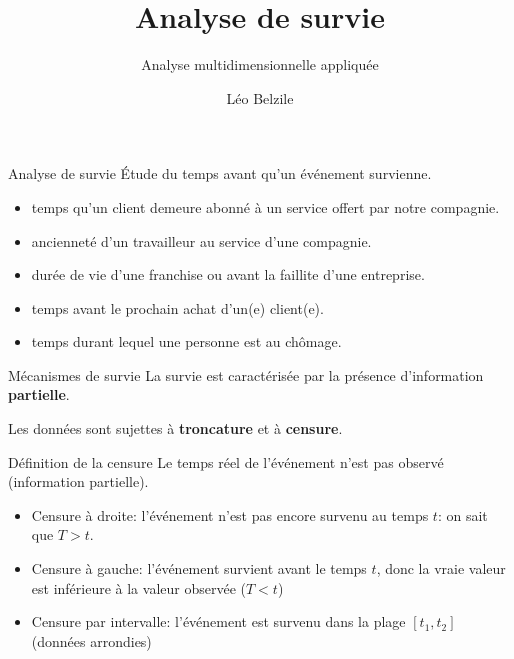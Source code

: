 \documentclass[
  ignorenonframetext,
]{beamer}
\title{Analyse de survie}
\subtitle{Analyse multidimensionnelle appliquée}
\author{Léo Belzile}
\date{}
\institute{HEC Montréal}
\providecommand{\tightlist}{%
  \setlength{\itemsep}{0pt}\setlength{\parskip}{0pt}}\usepackage{longtable,booktabs,array}
\begin{document}
\frame{\titlepage}
\ifdefined\Shaded\renewenvironment{Shaded}{\begin{tcolorbox}[frame hidden, sharp corners, breakable, boxrule=0pt, borderline west={3pt}{0pt}{shadecolor}, interior hidden, enhanced]}{\end{tcolorbox}}\fi

\begin{frame}{Analyse de survie}
\protect\hypertarget{analyse-de-survie}{}
Étude du temps avant qu'un événement survienne.

\begin{itemize}
\tightlist
\item
  temps qu'un client demeure abonné à un service offert par notre
  compagnie.
\item
  ancienneté d'un travailleur au service d'une compagnie.
\item
  durée de vie d'une franchise ou avant la faillite d'une entreprise.
\item
  temps avant le prochain achat d'un(e) client(e).
\item
  temps durant lequel une personne est au chômage.
\end{itemize}
\end{frame}

\begin{frame}{Mécanismes de survie}
\protect\hypertarget{muxe9canismes-de-survie}{}
La survie est caractérisée par la présence d'information
\textbf{partielle}.

Les données sont sujettes à \textbf{troncature} et à \textbf{censure}.
\end{frame}

\begin{frame}{Définition de la censure}
\protect\hypertarget{duxe9finition-de-la-censure}{}
Le temps réel de l'événement n'est pas observé (information partielle).

\begin{itemize}
\tightlist
\item
  Censure à droite: l'événement n'est pas encore survenu au temps \(t\):
  on sait que \(T > t\).
\item
  Censure à gauche: l'événement survient avant le temps \(t\), donc la
  vraie valeur est inférieure à la valeur observée (\(T < t\))
\item
  Censure par intervalle: l'événement est survenu dans la plage
  \([t_1, t_2]\) (données arrondies)
\end{itemize}
\end{frame}
\end{document}

